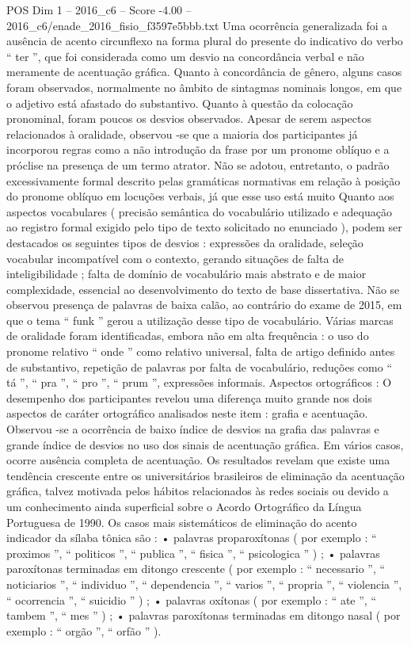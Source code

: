 \begin{textsample}{POS Dim 1 – 2016\_c6 – Score -4.00 – 2016\_c6/enade\_2016\_fisio\_f3597e5bbb.txt}
Uma ocorrência generalizada foi a ausência de acento circunflexo na forma plural do presente do indicativo do verbo “ ter ”, que foi considerada como um desvio na concordância verbal e não meramente de acentuação gráfica.
Quanto à concordância de gênero, alguns casos foram observados, normalmente no âmbito de sintagmas nominais longos, em que o adjetivo está afastado do substantivo.
Quanto à questão da colocação pronominal, foram poucos os desvios observados.
Apesar de serem aspectos relacionados à oralidade, observou -se que a maioria dos participantes já incorporou regras como a não introdução da frase por um pronome oblíquo e a próclise na presença de um termo atrator.
Não se adotou, entretanto, o padrão excessivamente formal descrito pelas gramáticas normativas em relação à posição do pronome oblíquo em locuções verbais, já que esse uso está muito Quanto aos aspectos vocabulares ( precisão semântica do vocabulário utilizado e adequação ao registro formal exigido pelo tipo de texto solicitado no enunciado ), podem ser destacados os seguintes tipos de desvios : expressões da oralidade, seleção vocabular incompatível com o contexto, gerando situações de falta de inteligibilidade ; falta de domínio de vocabulário mais abstrato e de maior complexidade, essencial ao desenvolvimento do texto de base dissertativa.
Não se observou presença de palavras de baixa calão, ao contrário do exame de 2015, em que o tema “ funk ” gerou a utilização desse tipo de vocabulário.
Várias marcas de oralidade foram identificadas, embora não em alta frequência : o uso do pronome relativo “ onde ” como relativo universal, falta de artigo definido antes de substantivo, repetição de palavras por falta de vocabulário, reduções como “ tá ”, “ pra ”, “ pro ”, “ prum ”, expressões informais.
Aspectos ortográficos : O desempenho dos participantes revelou uma diferença muito grande nos dois aspectos de caráter ortográfico analisados neste item : grafia e acentuação.
Observou -se a ocorrência de baixo índice de desvios na grafia das palavras e grande índice de desvios no uso dos sinais de acentuação gráfica.
Em vários casos, ocorre ausência completa de acentuação.
Os resultados revelam que existe uma tendência crescente entre os universitários brasileiros de eliminação da acentuação gráfica, talvez motivada pelos hábitos relacionados às redes sociais ou devido a um conhecimento ainda superficial sobre o Acordo Ortográfico da Língua Portuguesa de 1990.
Os casos mais sistemáticos de eliminação do acento indicador da sílaba tônica são : • palavras proparoxítonas ( por exemplo : “ proximos ”, “ politicos ”, “ publica ”, “ fisica ”, “ psicologica ” ) ; • palavras paroxítonas terminadas em ditongo crescente ( por exemplo : “ necessario ”, “ noticiarios ”, “ individuo ”, “ dependencia ”, “ varios ”, “ propria ”, “ violencia ”, “ ocorrencia ”, “ suicidio ” ) ; • palavras oxítonas ( por exemplo : “ ate ”, “ tambem ”, “ mes ” ) ; • palavras paroxítonas terminadas em ditongo nasal ( por exemplo : “ orgão ”, “ orfão ” ).

\end{textsample}
